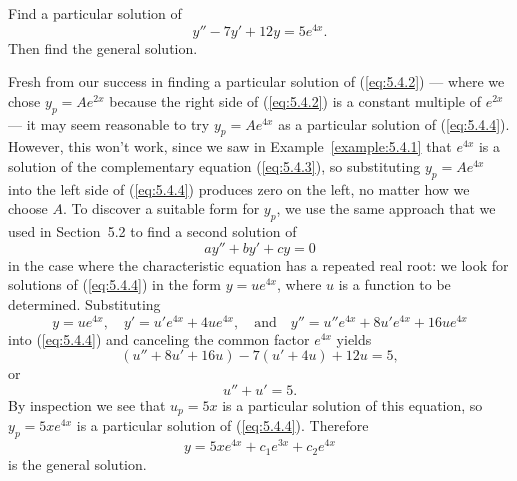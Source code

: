 \documentclass{ximera}
\begin{document}
\begin{example}\label{example:5.4.2}
Find a particular solution of
\begin{equation} \label{eq:5.4.4}
y''-7y'+12y=5e^{4x}.
\end{equation}
Then find the general solution.

\begin{explanation}
Fresh from our success in finding a particular solution of
(\ref{eq:5.4.2}) --- where we chose $y_p=Ae^{2x}$ because the right side
of
(\ref{eq:5.4.2}) is a constant multiple of $e^{2x}$ --- it may seem
reasonable to try $y_p=Ae^{4x}$ as a particular solution of
(\ref{eq:5.4.4}). However, this won't work, since we saw in
Example~\ref{example:5.4.1} that $e^{4x}$ is a solution of the
complementary equation (\ref{eq:5.4.3}), so substituting $y_p=Ae^{4x}$
into the left side of (\ref{eq:5.4.4}) produces zero on the left, no
matter how we choose $A$. To discover a suitable form for $y_p$,
we use the same approach that we used in Section~5.2 to find a
second solution of
$$
ay''+by'+cy=0
$$
in the case where the characteristic equation has a repeated real
root: we look for solutions of (\ref{eq:5.4.4}) in the form $y=ue^{4x}$,
where $u$ is a function to be determined. Substituting
\begin{equation} \label{eq:5.4.5}
y=ue^{4x},\quad
y'=u'e^{4x}+4ue^{4x},\quad\mbox{and}\quad
y''=u''e^{4x}+8u'e^{4x}+16ue^{4x}
\end{equation}
into (\ref{eq:5.4.4}) and canceling the common factor $e^{4x}$ yields
$$
(u''+8u'+16u)-7(u'+4u)+12u=5,
$$
or
$$
u''+u'=5.
$$
By inspection we  see that $u_p=5x$ is a particular solution of
this equation, so $y_p=5xe^{4x}$ is a particular solution of
(\ref{eq:5.4.4}). Therefore
$$
y=5xe^{4x}+c_1e^{3x}+c_2e^{4x}
$$
is the general solution.
\end{explanation}
\end{example}
\end{document}

